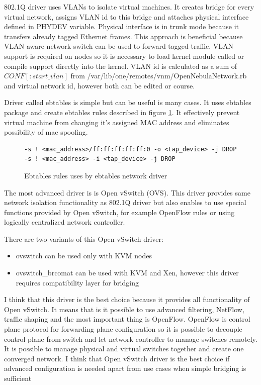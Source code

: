 802.1Q driver uses \Ac{VLAN}s to isolate virtual machines. It creates bridge for every virtual network, assigns \Ac{VLAN} id to this bridge and attaches physical interface defined in PHYDEV variable. Physical interface is in trunk mode because it transfers already tagged Ethernet frames. This approach is beneficial because \Ac{VLAN} aware network switch can be used to forward tagged traffic. \Ac{VLAN} support is required on nodes so it is necessary to load kernel module called  or compile support directly into the kernel. \Ac{VLAN} id is calculated as a sum of $CONF[:start\_vlan]$ from /var/lib/one/remotes/vnm/OpenNebulaNetwork.rb and virtual network id, however both can be edited or course.

Driver called ebtables is simple but can be useful is many cases. It uses ebtables package and create ebtables rules described in figure \ref{code:ebtables}. It effectively prevent virtual machine from changing it's assigned \Ac{MAC} address and eliminates possibility of mac spoofing.

\begin{figure}[htb]
\caption{Ebtables rules uses by ebtables network driver}
\label{code:ebtables}
\begin{verbatim}
-s ! <mac_address>/ff:ff:ff:ff:ff:0 -o <tap_device> -j DROP
-s ! <mac_address> -i <tap_device> -j DROP
\end{verbatim}
\end{figure}

The most advanced driver is is Open vSwitch (\Ac{OVS}). This driver provides same network isolation functionality as 802.1Q driver but also enables to use special functions provided by Open vSwitch, for example OpenFlow rules or using logically centralized network controller.

There are two variants of this Open vSwitch driver:
\begin{itemize}
	\item ovswitch can be used only with \Ac{KVM} nodes
	\item ovswitch\_brcomat can be used with \Ac{KVM} and Xen, however this driver requires compatibility layer for bridging
\end{itemize}

I think that this driver is the best choice because it provides all functionality of Open vSwitch. It means that is it possible to use advanced filtering, NetFlow, traffic shaping and the most important thing is OpenFlow. OpenFlow is control plane protocol for forwarding plane configuration so it is possible to decouple control plane from switch and let network controller to manage switches remotely. It is possible to manage physical and virtual switches together and create one converged network. I think that Open vSwitch driver is the best choice if advanced configuration is needed apart from use cases when simple bridging is sufficient


